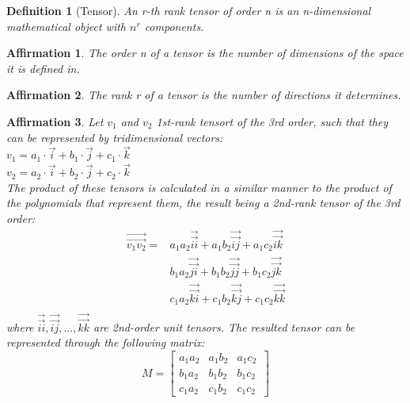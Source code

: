\documentclass{article}
\newtheorem{definition}{Definition}[section]
\newtheorem{prop}{Affirmation}[section]
\begin{document}
\begin{definition}[Tensor]
An r-th rank tensor of order n is an n-dimensional mathematical object with $n^r$ components. \cite{Tensor}
\end{definition}

\begin{prop}
The order n of a tensor is the number of dimensions of the space it is defined in. \cite{Tensor}
\end{prop}

\begin{prop}
The rank r of a tensor is the number of directions it determines. \cite{Tensor_Rank}
\end{prop}

\begin{prop}
	Let $v_1$ and $v_2$ 1st-rank tensort of the 3rd order, such that they can be represented by tridimensional vectors:\\
	$v_1 = a_1 \cdot \vec{i} + b_1 \cdot \vec{j} + c_1 \cdot \vec{k}$\\
	$v_2 = a_2 \cdot \vec{i} + b_2 \cdot \vec{j} + c_2 \cdot \vec{k}$\\
	The product of these tensors \cite{Tensor_Multiplication} is calculated in a similar manner to the product of the polynomials that represent them, the result being a 2nd-rank tensor of the 3rd order:\\
\begin{align*}
	\overrightarrow{\overrightarrow{v_1 v_2}} = &a_1 a_2 \overrightarrow{\overrightarrow{ii}} + a_1 b_2 \overrightarrow{\overrightarrow{ij}} + a_1 c_2 \overrightarrow{\overrightarrow{ik}}\\
	&b_1 a_2 \overrightarrow{\overrightarrow{ji}} + b_1 b_2 \overrightarrow{\overrightarrow{jj}} + b_1 c_2 \overrightarrow{\overrightarrow{jk}}\\
	&c_1 a_2 \overrightarrow{\overrightarrow{ki}} + c_1 b_2 \overrightarrow{\overrightarrow{kj}} + c_1 c_2 \overrightarrow{\overrightarrow{kk}}\\
\end{align*}
where $\overrightarrow{\overrightarrow{ii}}, \overrightarrow{\overrightarrow{ij}},...,\overrightarrow{\overrightarrow{kk}}$ are 2nd-order unit tensors. The resulted tensor can be represented through the following matrix:\\
 \[
   M=
  \left[ {\begin{array}{ccc}
  	a_1 a_2	 & a_1 b_2 & a_1 c_2 \\
	b_1 a_2	 & b_1 b_2 & b_1 c_2 \\
	c_1 a_2	 & c_1 b_2 & c_1 c_2 \ 
  \end{array} } \right]
\]
\end{prop}
\end{document}
